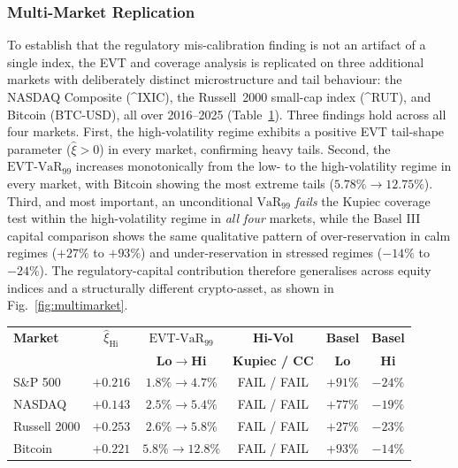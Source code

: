 \documentclass[]{interact}
\begin{document}
\subsubsection{Multi-Market Replication}
\label{subsubsec:multimarket}
To establish that the regulatory mis-calibration finding is not an artifact
of a single index, the EVT and coverage analysis is replicated on three
additional markets with deliberately distinct microstructure and tail
behaviour: the NASDAQ Composite (\^{}IXIC), the Russell~2000 small-cap index
(\^{}RUT), and Bitcoin (BTC-USD), all over 2016--2025
(Table~\ref{tab:multimarket}). Three findings hold across all four markets. First, the
high-volatility regime exhibits a positive EVT tail-shape parameter
($\hat{\xi}>0$) in every market, confirming heavy tails. Second, the
$\text{EVT-VaR}_{99}$ increases monotonically from the low- to the high-volatility
regime in every market, with Bitcoin showing the most extreme tails
($5.78\%\!\rightarrow\!12.75\%$). Third, and most important, an
unconditional $\text{VaR}_{99}$ \emph{fails} the Kupiec coverage test within the
high-volatility regime in \emph{all four} markets, while the Basel III
capital comparison shows the same qualitative pattern of over-reservation in
calm regimes ($+27\%$ to $+93\%$) and under-reservation in stressed regimes
($-14\%$ to $-24\%$). The regulatory-capital contribution therefore
generalises across equity indices and a structurally different crypto-asset, as shown in Fig.~\ref{fig:multimarket}.

\begin{table}[H]
{\footnotesize
\renewcommand{\arraystretch}{1.25}
\setlength{\tabcolsep}{3.5pt}
\begin{tabular}{lccccc}
\toprule
\textbf{Market} & \textbf{$\hat{\xi}_{\text{Hi}}$} & \textbf{$\text{EVT-VaR}_{99}$} & \textbf{Hi-Vol} & \textbf{Basel} & \textbf{Basel} \\
 & & \textbf{Lo$\rightarrow$Hi} & \textbf{Kupiec / CC} & \textbf{Lo} & \textbf{Hi} \\
\midrule
S\&P 500     & $+0.216$ & $1.8\%\!\rightarrow\!4.7\%$  & FAIL / FAIL & $+91\%$ & $-24\%$ \\
NASDAQ       & $+0.143$ & $2.5\%\!\rightarrow\!5.4\%$  & FAIL / FAIL & $+77\%$ & $-19\%$ \\
Russell 2000 & $+0.253$ & $2.6\%\!\rightarrow\!5.8\%$  & FAIL / FAIL & $+27\%$ & $-23\%$ \\
Bitcoin      & $+0.221$ & $5.8\%\!\rightarrow\!12.8\%$ & FAIL / FAIL & $+93\%$ & $-14\%$ \\
\bottomrule
\end{tabular}}
\label{tab:multimarket}
\end{table}
\end{document}
